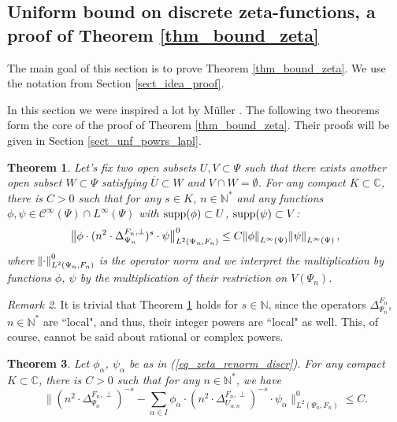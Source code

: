 \documentclass[12pt]{article}
\numberwithin{equation}{section}
\theoremstyle{theorem}
\newtheorem{thm}{Theorem}[section]
\theoremstyle{definition}
\theoremstyle{remark}
\newtheorem{rem}[thm]{Remark}
\newcommand{\comp}{\mathbb{C}}
\newcommand{\nat}{\mathbb{N}}
\newcommand{\ccal}{\mathscr{C}}
\newcommand{\laplcomp}{\Delta}
\begin{document}
\subsection{Uniform bound on discrete zeta-functions, a proof of Theorem \ref{thm_bound_zeta}}\label{sect_conv_whole_plane}
	The main goal of this section is to prove Theorem \ref{thm_bound_zeta}.
	We use the notation from Section \ref{sect_idea_proof}.
	\par
	In this section we were inspired a lot by Müller \cite{Mull78}.
	The following two theorems form the core of the proof of Theorem \ref{thm_bound_zeta}. 
	Their proofs will be given in Section \ref{sect_unf_powrs_lapl}.
	\begin{thm}\label{thm_power_bnd_supp_disj}
		Let's fix two open subsets $U, V \subset \Psi$ such that there exists another open subset $W \subset \Psi$ satisfying $\overline{U} \subset W$ and $V \cap W = \emptyset$.
		For any compact $K \subset \comp$, there is $C > 0$ such that for any $s \in K$, $n \in \nat^*$ and any functions $\phi, \psi \in \ccal^{\infty}(\Psi) \cap L^{\infty}(\Psi)$ with ${\rm{supp}}(\phi) \subset U$, ${\rm{supp}}(\psi) \subset V$:
		\begin{equation}
			\big\| \phi \cdot ( n^2 \cdot\laplcomp_{\Psi_n}^{F_n, \perp})^{s} \cdot \psi \big\|_{L^2(\Psi_n, F_n)}^{0} \leq C \norm{\phi}_{L^{\infty}(\Psi)} \norm{\psi}_{L^{\infty}(\Psi)},
		\end{equation}
		where $\norm{\cdot}_{L^2(\Psi_n, F_n)}^{0}$ is the operator norm and we interpret the multiplication by functions $\phi$, $\psi$ by the multiplication of their restriction on $V(\Psi_n)$.
	\end{thm}
	\begin{rem}
		It is trivial that Theorem \ref{thm_power_bnd_supp_disj} holds for $s \in \nat$, since the operators $\laplcomp_{\Psi_n}^{F_n}$, $n \in \nat^*$ are “local", and thus, their integer powers are “local" as well. This, of course, cannot be said about rational or complex powers.
	\end{rem}
	\begin{thm}\label{thm_power_diff_bnd}
		Let $\phi_{\alpha}$, $\psi_{\alpha}$ be as in (\ref{eq_zeta_renorm_discr}).
		For any compact $K \subset \comp$, there is $C > 0$ such that for any $n \in \nat^*$, we have
		\begin{equation}
			\Big\| 
				(n^2 \cdot\laplcomp_{\Psi_n}^{F_n, \perp})^{-s} - \sum_{\alpha \in I} \phi_{\alpha} \cdot (n^2 \cdot  \laplcomp_{U_{\alpha, n}}^{F_n, \perp})^{-s} \cdot \psi_{\alpha}
			\Big\|_{L^2(\Psi_n, F_n)}^{0} \leq C.
		\end{equation}
	\end{thm}
\end{document}
